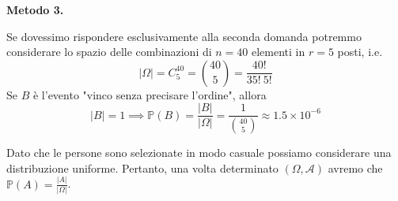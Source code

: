 \textbf{Metodo 3.}

Se dovessimo rispondere esclusivamente alla seconda domanda potremmo considerare lo spazio delle combinazioni di $n=40$ elementi in $r=5$ posti, i.e.
\begin{equation*}
| \Omega | =C_{5}^{40} =\binom{40}{5} =\frac{40!}{35!\ 5!}
\end{equation*}
Se $B$ è l'evento "vinco senza precisare l'ordine", allora
\begin{equation*}
| B| =1\mathbb{\implies P}( B) =\frac{| B| }{| \Omega | } =\frac{1}{\binom{40}{5}} \approx 1.5\times 10^{-6}
\end{equation*}
\Soluzione

Dato che le persone sono selezionate in modo casuale possiamo considerare una distribuzione uniforme. Pertanto, una volta determinato $( \Omega ,\mathcal{A})$ avremo che $\mathbb{P}( A) =\frac{| A| }{| \Omega | }$.
